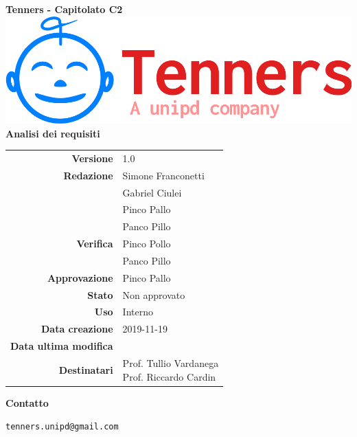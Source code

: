 \begin{titlepage}
	\begin{center}
		\large \textbf{Tenners - Capitolato C2}
		\vfill
		\includegraphics[scale = 0.3]{./res/img/logo.png}\\
		\vfill
		\Huge \textbf{Analisi dei requisiti}

        \vfill
        \large

        \begin{tabular}{r|l}
                        \textbf{Versione} & 1.0 \\
                        \textbf{Redazione} &
                        Simone Franconetti\\&
                        Gabriel Ciulei \\&
                        Pinco Pallo \\&
                        Panco Pillo \\
                        \textbf{Verifica} & 
                        Pinco Pollo \\&
                        Panco Pillo \\
                        \textbf{Approvazione} & Pinco Pallo \\
                        \textbf{Stato} & Non approvato \\
                        \textbf{Uso} &  Interno\\
                        \textbf{Data creazione} &  2019-11-19\\
                        \textbf{Data ultima modifica} &  \\
                        \textbf{Destinatari} & \parbox[t]{5cm}{Prof. Tullio Vardanega\\Prof. Riccardo Cardin}
                \end{tabular}
                \vfill
                \normalsize
                \vfill
                \textbf{Contatto}
                
                \texttt{tenners.unipd@gmail.com}

	\end{center}
\end{titlepage}